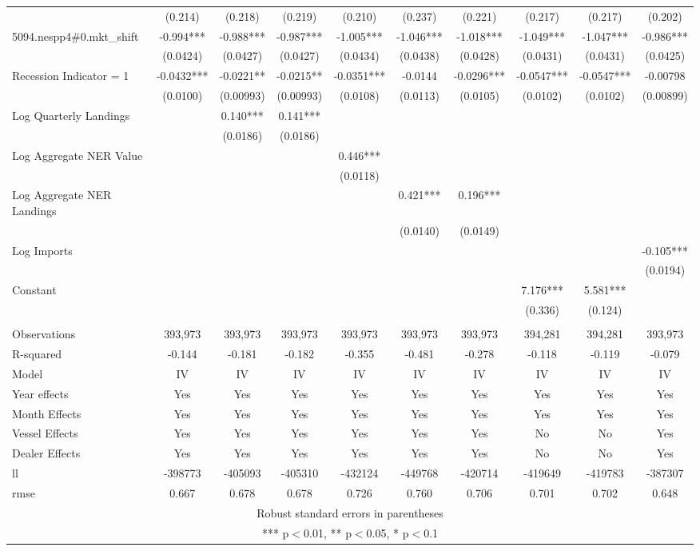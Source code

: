 \begin{tabular}{lccccccccc}
 & (0.214) & (0.218) & (0.219) & (0.210) & (0.237) & (0.221) & (0.217) & (0.217) & (0.202) \\
5094.nespp4\#0.mkt\_shift & -0.994*** & -0.988*** & -0.987*** & -1.005*** & -1.046*** & -1.018*** & -1.049*** & -1.047*** & -0.986*** \\
 & (0.0424) & (0.0427) & (0.0427) & (0.0434) & (0.0438) & (0.0428) & (0.0431) & (0.0431) & (0.0425) \\
Recession Indicator = 1 & -0.0432*** & -0.0221** & -0.0215** & -0.0351*** & -0.0144 & -0.0296*** & -0.0547*** & -0.0547*** & -0.00798 \\
 & (0.0100) & (0.00993) & (0.00993) & (0.0108) & (0.0113) & (0.0105) & (0.0102) & (0.0102) & (0.00899) \\
Log Quarterly Landings &  & 0.140*** & 0.141*** &  &  &  &  &  &  \\
 &  & (0.0186) & (0.0186) &  &  &  &  &  &  \\
Log Aggregate NER Value &  &  &  & 0.446*** &  &  &  &  &  \\
 &  &  &  & (0.0118) &  &  &  &  &  \\
Log Aggregate NER Landings &  &  &  &  & 0.421*** & 0.196*** &  &  &  \\
 &  &  &  &  & (0.0140) & (0.0149) &  &  &  \\
Log Imports &  &  &  &  &  &  &  &  & -0.105*** \\
 &  &  &  &  &  &  &  &  & (0.0194) \\
Constant &  &  &  &  &  &  & 7.176*** & 5.581*** &  \\
 &  &  &  &  &  &  & (0.336) & (0.124) &  \\
 &  &  &  &  &  &  &  &  &  \\
Observations & 393,973 & 393,973 & 393,973 & 393,973 & 393,973 & 393,973 & 394,281 & 394,281 & 393,973 \\
R-squared & -0.144 & -0.181 & -0.182 & -0.355 & -0.481 & -0.278 & -0.118 & -0.119 & -0.079 \\
Model & IV & IV & IV & IV & IV & IV & IV & IV & IV \\
Year effects & Yes & Yes & Yes & Yes & Yes & Yes & Yes & Yes & Yes \\
Month Effects & Yes & Yes & Yes & Yes & Yes & Yes & Yes & Yes & Yes \\
Vessel Effects & Yes & Yes & Yes & Yes & Yes & Yes & No & No & Yes \\
Dealer Effects & Yes & Yes & Yes & Yes & Yes & Yes & No & No & Yes \\
ll & -398773 & -405093 & -405310 & -432124 & -449768 & -420714 & -419649 & -419783 & -387307 \\
 rmse & 0.667 & 0.678 & 0.678 & 0.726 & 0.760 & 0.706 & 0.701 & 0.702 & 0.648 \\ \hline
\multicolumn{10}{c}{ Robust standard errors in parentheses} \\
\multicolumn{10}{c}{ *** p$<$0.01, ** p$<$0.05, * p$<$0.1} \\
\end{tabular}
